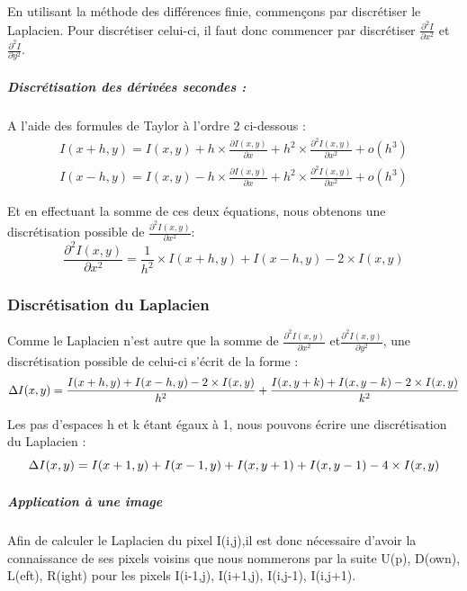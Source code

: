 En utilisant la méthode des différences finie, commençons par discrétiser le Laplacien.
Pour discrétiser celui-ci, il faut donc commencer par discrétiser $\frac{\partial^2 I}{\partial x^2}$ et  $\frac{\partial^2 I}{\partial y^2}$. 

\subparagraph{Discrétisation des dérivées secondes :}

A l'aide des formules de Taylor à l'ordre 2 ci-dessous : 
\begin{equation*}
\begin{aligned}
    I(x+h,y) = I(x,y)+h\times \frac{\partial I(x,y)}{\partial x}+ h^2 \times \frac{\partial ^2 I(x,y)}{\partial x^2} + o(h^3) \\
    I(x-h,y) =I(x,y)- h\times  \frac{\partial I(x,y)}{\partial x}+ h^2 \times \frac{\partial^2 I(x,y)}{\partial x^2} + o(h^3)
\end{aligned}
\end{equation*}


Et en effectuant la somme de ces deux équations, nous obtenons une discrétisation possible de $\frac{\partial ^2 I(x,y)}{\partial x^2}$:  
\begin{equation*}
    \frac{\partial ^2 I(x,y)}{\partial x^2} =\frac{1}{h^2} \times I(x+h,y) + I(x-h,y) - 2\times I(x,y)
\end{equation*}

\subsubsection{Discrétisation du Laplacien}
Comme le Laplacien n'est autre que la somme de $\frac{\partial ^2 I(x,y)}{\partial x^2}$ et$\frac{\partial ^2 I(x,y)}{\partial y^2}$, une discrétisation possible de celui-ci s'écrit de la forme  : 
\begin{equation*}
    \Delta I(x,y) =  \frac{I(x+h,y) + I(x-h,y) - 2\times I(x,y)}{h^2}  + \frac{I(x,y+k) + I(x,y-k) - 2\times I(x,y)}{k^2} \\
\end{equation*}

Les pas d'espaces h et k étant égaux à 1, nous pouvons écrire une discrétisation du Laplacien  :
\begin{equation*}
     \Delta I(x,y) =  I(x+1,y) + I(x-1,y)+ I(x,y+1) + I(x,y-1) - 4\times I(x,y)  \\
\end{equation*}

\subparagraph{Application à une image }
Afin de calculer le Laplacien du pixel I(i,j),il est donc nécessaire d'avoir la connaissance de ses pixels voisins que nous nommerons par la suite U(p), D(own), L(eft), R(ight) pour les pixels I(i-1,j), I(i+1,j), I(i,j-1), I(i,j+1). 

